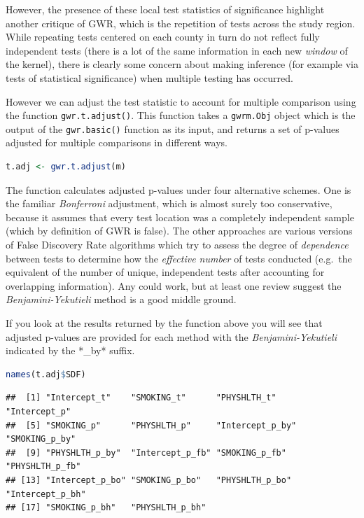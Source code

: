 \documentclass[
]{book}
\newcommand{\passthrough}[1]{#1}
\begin{document}
However, the presence of these local test statistics of significance highlight another critique of GWR, which is the repetition of tests across the study region. While repeating tests centered on each county in turn do not reflect fully independent tests (there is a lot of the same information in each new \emph{window} of the kernel), there is clearly some concern about making inference (for example via tests of statistical significance) when multiple testing has occurred.

However we can adjust the test statistic to account for multiple comparison using the function \passthrough{\lstinline!gwr.t.adjust()!}. This function takes a \passthrough{\lstinline!gwrm.Obj!} object which is the output of the \passthrough{\lstinline!gwr.basic()!} function as its input, and returns a set of p-values adjusted for multiple comparisons in different ways.

\begin{lstlisting}[language=R]
t.adj <- gwr.t.adjust(m)
\end{lstlisting}

The function calculates adjusted p-values under four alternative schemes. One is the familiar \emph{Bonferroni} adjustment, which is almost surely too conservative, because it assumes that every test location was a completely independent sample (which by definition of GWR is false). The other approaches are various versions of False Discovery Rate algorithms which try to assess the degree of \emph{dependence} between tests to determine how the \emph{effective number} of tests conducted (e.g.~the equivalent of the number of unique, independent tests after accounting for overlapping information). Any could work, but at least one review suggest the \emph{Benjamini-Yekutieli} method is a good middle ground.

If you look at the results returned by the function above you will see that adjusted p-values are provided for each method with the \emph{Benjamini-Yekutieli} indicated by the *\_by* suffix.

\begin{lstlisting}[language=R]
names(t.adj$SDF)
\end{lstlisting}

\begin{lstlisting}
##  [1] "Intercept_t"    "SMOKING_t"      "PHYSHLTH_t"     "Intercept_p"   
##  [5] "SMOKING_p"      "PHYSHLTH_p"     "Intercept_p_by" "SMOKING_p_by"  
##  [9] "PHYSHLTH_p_by"  "Intercept_p_fb" "SMOKING_p_fb"   "PHYSHLTH_p_fb" 
## [13] "Intercept_p_bo" "SMOKING_p_bo"   "PHYSHLTH_p_bo"  "Intercept_p_bh"
## [17] "SMOKING_p_bh"   "PHYSHLTH_p_bh"
\end{lstlisting}
\end{document}
